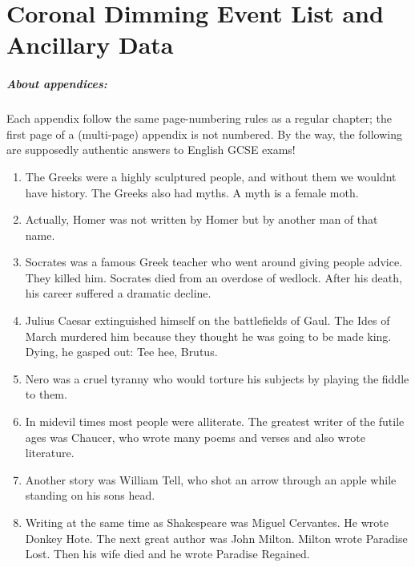 \chapter{Coronal Dimming Event List and Ancillary Data}

\paragraph{About appendices:}
	Each appendix follow the same page-numbering rules
	as a regular chapter; the first page of a
	(multi-page) appendix is not numbered.
	By the way, the following are supposedly
	authentic answers to English GCSE exams!


\begin{enumerate}

\item
The Greeks were a highly sculptured people, and without
them we wouldnt have history. The Greeks also had myths.
A myth is a female moth.

\item
Actually, Homer was not written by Homer but by another
man of that name.

\item
Socrates was a famous Greek teacher who went around
giving people advice. They killed him. Socrates died from an
overdose of wedlock. After his death, his career suffered a
dramatic decline.

\item
Julius Caesar extinguished himself on the battlefields
of Gaul. The Ides of March murdered him because they thought
he was going to be made king. Dying, he gasped out: Tee hee,
Brutus.

\item
Nero was a cruel tyranny who would torture his subjects
by playing the fiddle to them.

\item
In midevil times most people were alliterate. The
greatest writer of the futile ages was Chaucer, who
wrote many poems and verses and also wrote literature.

\item
Another story was William Tell, who shot an arrow
through an apple while standing on his sons head.

\item
Writing at the same time as Shakespeare was Miguel
Cervantes. He wrote Donkey Hote. The next great author
was John Milton. Milton wrote Paradise Lost. Then his
wife died and he wrote Paradise Regained.


\end{enumerate}
